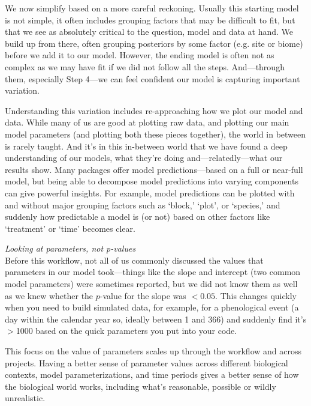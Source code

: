 \documentclass[11pt]{article}
\begin{document}
{We now simplify based on a more careful reckoning. Usually this starting model is not simple, it often includes grouping factors that may be difficult to fit, but that we see as absolutely critical to the question, model and data at hand. We build up from there, often grouping posteriors by some factor (e.g. site or biome) before we add it to our model. 
However, the ending model is often not as complex as we may have fit if we did not follow all the steps. 
And---through them, especially Step 4---we can feel confident our model is capturing important variation. 

Understanding this variation includes re-approaching how we plot our model and data. While many of us are good at plotting raw data, and plotting our main model parameters (and plotting both these pieces together), the world in between is rarely taught. And it's in this in-between world that we have found a deep understanding of our models, what they're doing and---relatedly---what our results show. Many packages offer model predictions---based on a full or near-full model, but being able to decompose model predictions into varying components can give powerful insights. For example, model predictions can be plotted with and without major grouping factors such as `block,' `plot', or `species,' and suddenly how predictable a model is (or not) based on other factors like `treatment' or `time' becomes clear. 

 \emph{Looking at parameters, not p-values} \\
Before this workflow, not all of us commonly discussed the values that parameters in our model took---things like the slope and intercept (two common model parameters) were sometimes reported, but we did not know them as well as we knew whether the $p$-value for the slope was $<0.05$. This changes quickly when you need to build simulated data, for example, for a phenological event (a day within the calendar year so, ideally between 1 and 366) and suddenly find it's $>$1000 based on the quick parameters you put into your code. 

This focus on the value of parameters scales up through the workflow and across projects. Having a better sense of parameter values across different biological contexts, model parameterizations, and time periods gives a better sense of how the biological world works, including what's reasonable, possible or wildly unrealistic. %

}
\end{document}
